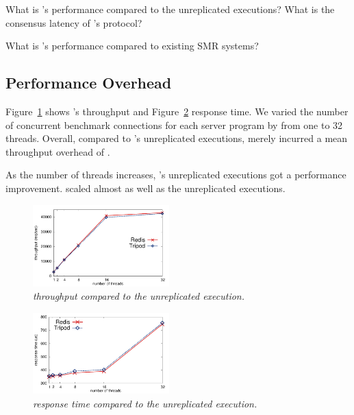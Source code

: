 \begin{tightenum}

\item[\S\ref{sec:overhead}:] What is \xxx's performance compared to the 
unreplicated executions? What is the consensus latency of \xxx's \paxos 
protocol?

\item[\S\ref{sec:compare}:] What is \xxx's performance compared to existing 
SMR systems?



\end{tightenum}

\subsection{Performance Overhead} \label{sec:overhead}

Figure~\ref{fig:tput} shows \xxx's throughput and 
Figure~\ref{fig:latency} response time. We varied the number of concurrent 
benchmark connections for each server program by from one to 32 threads. 
Overall, compared to \redis's unreplicated executions, \xxx merely incurred a 
mean throughput overhead of \tputoverhead.

As the number of threads increases, \redis's unreplicated executions 
got a performance improvement. \xxx scaled almost as well as the unreplicated 
executions.

\begin{figure}[h]
\centering
\includegraphics[width=0.47\textwidth]{figures/throughput}
\caption{\small {\em \xxx throughput compared to the unreplicated 
execution.}}
\label{fig:tput}
\end{figure}
 
\begin{figure}[h]
\centering
\includegraphics[width=0.47\textwidth]{figures/latency}
\caption{\small {\em \xxx response time compared to the unreplicated 
execution.}}
\label{fig:latency}
\end{figure}

